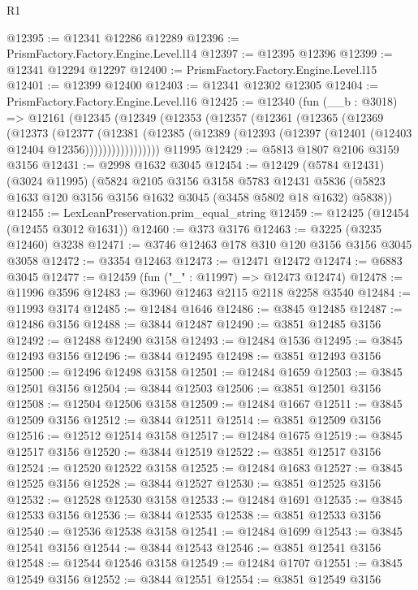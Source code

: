 \begin{lexlean}{R1}
\begin{coremodule}
@12395 := @12341 @12286 @12289
@12396 := PrismFactory.Factory.Engine.Level.l14
@12397 := @12395 @12396
@12399 := @12341 @12294 @12297
@12400 := PrismFactory.Factory.Engine.Level.l15
@12401 := @12399 @12400
@12403 := @12341 @12302 @12305
@12404 := PrismFactory.Factory.Engine.Level.l16
@12425 := @12340
    (fun (__b : @3018) =>
    @12161
      (@12345
        (@12349
          (@12353
            (@12357
              (@12361
                (@12365
                  (@12369
                    (@12373
                      (@12377
                        (@12381
                          (@12385
                            (@12389 (@12393 (@12397 (@12401 (@12403 @12404 @12356)))))))))))))))))
    @11995
@12429 := @5813 @1807 @2106 @3159 @3156
@12431 := @2998 @1632 @3045
@12454 := @12429
    (@5784 @12431)
    (@3024 @11995)
    (@5824
      @2105
      @3156
      @3158
      @5783
      @12431
      @5836
      (@5823 @1633 @120 @3156 @3156 @1632 @3045 (@3458 @5802 @18 @1632) @5838))
@12455 := LexLeanPreservation.prim_equal_string
@12459 := @12425 (@12454 (@12455 @3012 @1631))
@12460 := @373 @3176
@12463 := @3225 (@3235 @12460) @3238
@12471 := @3746 @12463 @178 @310 @120 @3156 @3156 @3045 @3058
@12472 := @3354 @12463
@12473 := @12471 @12472
@12474 := @6883 @3045
@12477 := @12459 (fun ("_" : @11997) => @12473 @12474)
@12478 := @11996 @3596
@12483 := @3960 @12463 @2115 @2118 @2258 @3540
@12484 := @11993 @3174
@12485 := @12484 @1646
@12486 := @3845 @12485
@12487 := @12486 @3156
@12488 := @3844 @12487
@12490 := @3851 @12485 @3156
@12492 := @12488 @12490 @3158
@12493 := @12484 @1536
@12495 := @3845 @12493 @3156
@12496 := @3844 @12495
@12498 := @3851 @12493 @3156
@12500 := @12496 @12498 @3158
@12501 := @12484 @1659
@12503 := @3845 @12501 @3156
@12504 := @3844 @12503
@12506 := @3851 @12501 @3156
@12508 := @12504 @12506 @3158
@12509 := @12484 @1667
@12511 := @3845 @12509 @3156
@12512 := @3844 @12511
@12514 := @3851 @12509 @3156
@12516 := @12512 @12514 @3158
@12517 := @12484 @1675
@12519 := @3845 @12517 @3156
@12520 := @3844 @12519
@12522 := @3851 @12517 @3156
@12524 := @12520 @12522 @3158
@12525 := @12484 @1683
@12527 := @3845 @12525 @3156
@12528 := @3844 @12527
@12530 := @3851 @12525 @3156
@12532 := @12528 @12530 @3158
@12533 := @12484 @1691
@12535 := @3845 @12533 @3156
@12536 := @3844 @12535
@12538 := @3851 @12533 @3156
@12540 := @12536 @12538 @3158
@12541 := @12484 @1699
@12543 := @3845 @12541 @3156
@12544 := @3844 @12543
@12546 := @3851 @12541 @3156
@12548 := @12544 @12546 @3158
@12549 := @12484 @1707
@12551 := @3845 @12549 @3156
@12552 := @3844 @12551
@12554 := @3851 @12549 @3156

\end{coremodule}
\end{lexlean}
